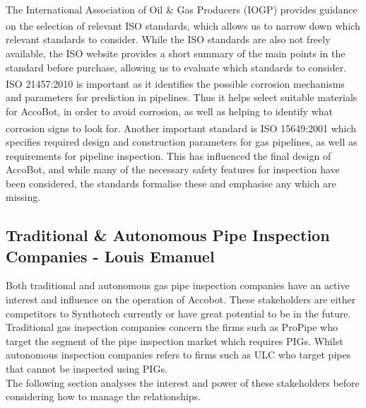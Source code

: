 \documentclass[11pt]{article}		%
\newcommand{\supercite}[1]{\textsuperscript{\cite{#1}}}		%
\begin{document}
			\\
			The International Association of Oil \& Gas Producers (IOGP) provides guidance on the selection of relevant ISO standards\supercite{iogp2017standards}, which allows us to narrow down which relevant standards to consider.
			While the ISO standards are also not freely available, the ISO website provides a short summary of the main points in the standard before purchase, allowing us to evaluate which standards to consider.
			ISO 21457:2010\supercite{iso21457} is important as it identifies the possible corrosion mechanisms and parameters for prediction in pipelines.
			Thus it helps select suitable materials for AccoBot, in order to avoid corrosion, as well as helping to identify what corrosion signs to look for.
			Another important standard is ISO 15649:2001\supercite{iso15649} which specifies required design and construction parameters for gas pipelines, as well as requirements for pipeline inspection.
			This has influenced the final design of AccoBot, and while many of the necessary safety features for inspection have been considered, the standards formalise these and emphasise any which are missing.
		
		\subsection[Traditional \& Autonomous Pipe Inspection Companies]{Traditional \& Autonomous Pipe Inspection Companies - Louis Emanuel}
            Both traditional and autonomous gas pipe inspection companies have an active interest and influence on the operation of Accobot. These stakeholders are either competitors to Synthotech currently or have great potential to be in the future. Traditional gas inspection companies concern the firms such as ProPipe who target the segment of the pipe inspection market which requires PIGs. Whilst autonomous inspection companies refers to firms such as ULC who target pipes that cannot be inspected using PIGs. \\
            \hspace*{3ex}The following section analyses the interest and power of these stakeholders before considering how to manage the relationships.
            
\end{document}
